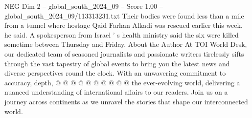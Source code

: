 \begin{textsample}{NEG Dim 2 – global\_south\_2024\_09 – Score 1.00 – global\_south\_2024\_09/113313231.txt}
Their bodies were found less than a mile from a tunnel where hostage Qaid Farhan Alkadi was rescued earlier this week, he said.
A spokesperson from Israel ' s health ministry said the six were killed sometime between Thursday and Friday.
About the Author At TOI World Desk, our dedicated team of seasoned journalists and passionate writers tirelessly sifts through the vast tapestry of global events to bring you the latest news and diverse perspectives round the clock.
With an unwavering commitment to accuracy, depth, @ @ @ @ @ @ @ @ @ @ the ever-evolving world, delivering a nuanced understanding of international affairs to our readers.
Join us on a journey across continents as we unravel the stories that shape our interconnected world.

\end{textsample}
